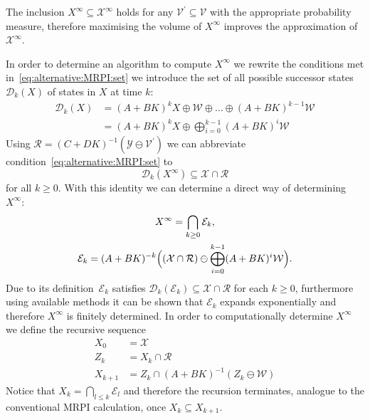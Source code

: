\documentclass{ifacconf}
\providecommand{\E}{\mathcal E}
\providecommand{\W}{\mathcal W}
\providecommand{\V}{\mathcal V}
\providecommand{\X}{\mathcal X}
\providecommand{\Y}{\mathcal Y}
\providecommand{\R}{\mathcal R}
\providecommand{\D}{\mathscr D}
\providecommand{\PP}{\mathbb P}
\begin{document}
%
The inclusion $X^\infty\subseteq\X^\infty$ holds for any $\V^\prime\subseteq\V$ with the appropriate probability measure, therefore maximising the volume of $X^\infty$ improves the approximation of $\X^\infty$.


In order to determine an algorithm to compute $X^\infty$ we rewrite the conditions met in~\eqref{eq:alternative:MRPI:set} we introduce the set of all possible successor states~$\D_k(X)$ of states in $X$ at time $k$:
%
\begin{align*}
	\D_k(X) &= (A+BK)^{k}X\oplus\W\oplus\dots\oplus(A+BK)^{k-1}\W\\
	&= (A+BK)^k X\oplus \bigoplus_{i=0}^{k-1}(A+BK)^i\W
\end{align*}
%
Using $\R = (C+DK)^{-1}(\Y\ominus\V^\prime)$ we can abbreviate condition~\eqref{eq:alternative:MRPI:set} to
%
\begin{equation}\label{eq:containment:condition:alternative:MRPI}
\D_k(X^\infty)\subseteq\X\cap\R
\end{equation}
%
for all $k\geq0$.
%
With this identity we can determine a direct way of determining $X^\infty$:
%
\begin{gather*}
X^\infty = %
\bigcap_{k\geq0} \E_k, \\
\E_k = (A+BK)^{-k}\Bigl((\X\cap\R)\ominus\bigoplus_{i=0}^{k-1}(A+BK)^i\W\Bigr) .
\end{gather*}
%
Due to its definition~$\E_k$ satisfies $\D_k(\E_k)\subseteq\X\cap\R$ for each $k\geq0$, furthermore using available methods it can be shown that $\E_k$ expands exponentially and therefore $X^\infty$ is finitely determined.
%
In order to computationally determine $X^\infty$ we define the recursive sequence
%
\begin{equation}\label{eq:MRPI:sequence}
	\begin{split}
	X_0 &= \X\\
	Z_k &= X_k\cap\R\\
	X_{k+1} &= Z_k\cap(A+BK)^{-1}(Z_k\ominus\W)
	\end{split}
\end{equation}
%
Notice that $X_k = \bigcap_{l\leq k}\E_l$ and therefore the recursion terminates, analogue to the conventional MRPI calculation, once $X_k\subseteq X_{k+1}$.
\end{document}
